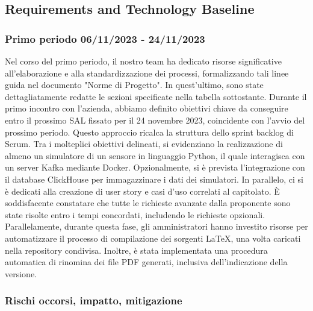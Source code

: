 \documentclass{article}
\begin{document}
\subsection{Requirements and Technology Baseline}
\subsubsection{Primo periodo  06/11/2023 - 24/11/2023}
Nel corso del primo periodo, il nostro team ha dedicato risorse significative all'elaborazione e alla standardizzazione dei processi, formalizzando tali linee guida nel documento "Norme di Progetto". In quest'ultimo, sono state dettagliatamente redatte le sezioni specificate nella tabella sottostante.
Durante il primo incontro con l'azienda, abbiamo definito obiettivi chiave da conseguire entro il prossimo SAL fissato per il 24 novembre 2023, coincidente con l'avvio del prossimo periodo. Questo approccio ricalca la struttura dello sprint backlog di Scrum.
Tra i molteplici obiettivi delineati, si evidenziano la realizzazione di almeno un simulatore di un sensore in linguaggio Python, il quale interagisca con un server Kafka mediante Docker. Opzionalmente, si è prevista l'integrazione con il database ClickHouse per immagazzinare i dati dei simulatori. In parallelo, ci si è dedicati alla creazione di user story e casi d'uso correlati al capitolato.
È soddisfacente constatare che tutte le richieste avanzate dalla proponente sono state risolte entro i tempi concordati, includendo le richieste opzionali.
Parallelamente, durante questa fase, gli amministratori hanno investito risorse per automatizzare il processo di compilazione dei sorgenti LaTeX, una volta caricati nella repository condivisa. Inoltre, è stata implementata una procedura automatica di rinomina dei file PDF generati, inclusiva dell'indicazione della versione.

\subsubsection*{Rischi occorsi, impatto, mitigazione}
\end{document}
